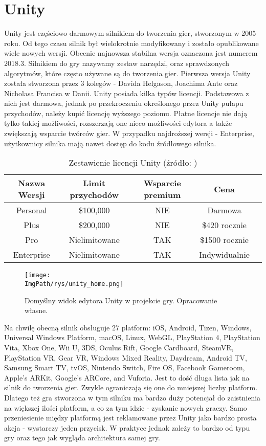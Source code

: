 \documentclass[a4paper,12pt,twoside,openany]{report}
\newcommand{\ImgPath}{.}
\begin{document}
\section{Unity}
Unity jest częściowo darmowym silnikiem do tworzenia gier, stworzonym w 2005 roku. Od tego czasu silnik był wielokrotnie modyfikowany i zostało opublikowane wiele nowych wersji. Obecnie najnowsza stabilna wersja oznaczona jest numerem 2018.3\cite{unity_wiki}. Silnikiem do gry nazywamy zestaw narzędzi, oraz sprawdzonych algorytmów, które często używane są do tworzenia gier. Pierwsza wersja Unity została stworzona przez 3 kolegów - Davida Helgason, Joachima Ante oraz Nicholasa Francisa w Danii. Unity posiada kilka typów licencji. Podstawowa z nich jest darmowa, jednak po przekroczeniu określonego przez Unity pułapu przychodów, należy kupić licencję wyższego poziomu. Płatne licencje nie dają tylko takiej możliwości, rozszerzają one nieco możliwości edytora a także zwiększają wsparcie twórców gier. W przypadku najdroższej wersji - Enterprise, użytkownicy silnika mają nawet dostęp do kodu źródłowego silnika.

\begin{table}[h!]
\centering
\begin{tabular}{c|cccc}
Nazwa Wersji & Limit przychodów & Wsparcie premium & Cena \\ \hline
Personal & \$100,000 & NIE & Darmowa \\
Plus & \$200,000 & NIE & \$420 rocznie \\
Pro & Nielimitowane & TAK & \$1500 rocznie \\
Enterprise & Nielimitowane & TAK & Indywidualnie \\
\end{tabular}
\caption{Zestawienie licencji Unity (źródło: \cite{unity_wiki})}
\label{table_unity_versions}
\end{table}

\begin{figure}[!htbp]
	\begin{center}
\centering
\texttt{[image: \\ImgPath/rys/unity\_home.png]}
\end{center}
	\caption{Domyślny widok edytora Unity w projekcie gry. Opracowanie własne.}
	\label{unity_home}
\end{figure}

Na chwilę obecną silnik obsługuje 27 platform: iOS, Android, Tizen, Windows, Universal Windows Platform, macOS, Linux, WebGL, PlayStation 4, PlayStation Vita, Xbox One, Wii U, 3DS, Oculus Rift, Google Cardboard, SteamVR, PlayStation VR, Gear VR, Windows Mixed Reality, Daydream, Android TV, Samsung Smart TV, tvOS, Nintendo Switch, Fire OS, Facebook Gameroom, Apple's ARKit, Google's ARCore, and Vuforia. Jest to dość długa lista jak na silnik do tworzenia gier. Zwykle ograniczają się one do mniejszej liczby platform. Dlatego też gra stworzona w tym silniku ma bardzo duży potencjał do zaistnienia na większej ilości platform, a co za tym idzie - zyskanie nowych graczy. Samo przeniesienie między platformą jest reklamowane przez Unity jako bardzo prosta akcja - wystarczy jeden przycisk. W praktyce jednak zależy to bardzo od typu gry oraz tego jak wygląda architektura samej gry.
\end{document}
